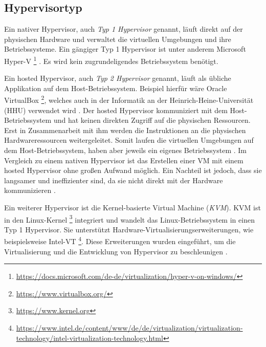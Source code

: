 \subsection{Hypervisortyp}
Ein nativer Hypervisor, auch \textit{Typ 1 Hypervisor} genannt, läuft direkt auf der physischen Hardware
und verwaltet die virtuellen Umgebungen und ihre Betriebssysteme. Ein gängiger Typ 1 Hypervisor ist
unter anderem Microsoft Hyper-V
\footnote{\url{https://docs.microsoft.com/de-de/virtualization/hyper-v-on-windows/}}
\cite{RedHatHypervisor}. Es wird kein zugrundeligendes Betriebssystem
benötigt.

Ein hosted Hypervisor, auch \textit{Typ 2 Hypervisor}  genannt, läuft als übliche
Applikation auf dem Host-Betriebssystem. Beispiel hierfür wäre Oracle VirtualBox
\footnote{\url{https://www.virtualbox.org/}}, welches auch in der Informatik
an der Heinrich-Heine-Universität (HHU) verwendet wird \cite{HHUFachschaft}.
Der hosted Hypervisor kommuniziert mit dem Host-Betriebssystem und hat keinen direkten Zugriff auf die
physischen Ressourcen. Erst in Zusammenarbeit mit ihm
werden die Instruktionen an die physischen Hardwareressourcen weitergeleitet.
Somit laufen die virtuellen Umgebungen auf dem Host-Betriebssystem,
haben aber jeweils ein eigenes Betriebssystem \cite{RedHatHypervisor}.
Im Vergleich zu einem nativen Hypervisor ist das Erstellen einer VM
mit einem hosted Hypervisor ohne großen Aufwand möglich.
Ein Nachteil ist jedoch, dass sie langsamer und ineffizienter sind, da sie nicht
direkt mit der Hardware kommunizieren \cite{IBMHypervisor}.

Ein weiterer Hypervisor ist die Kernel-basierte Virtual Machine (\textit{KVM}).
KVM ist in den Linux-Kernel \footnote{\url{https://www.kernel.org}} integriert und wandelt
das Linux-Betriebssystem in einen Typ 1 Hypervisor. Sie unterstützt
Hardware-Virtualisierungserweiterungen, wie beispielsweise Intel-VT
\footnote{\url{https://www.intel.de/content/www/de/de/virtualization/virtualization-technology/intel-virtualization-technology.html}}.
Diese Erweiterungen wurden eingeführt,
um die Virtualisierung und die Entwicklung
von Hypervisor zu beschleunigen \cite{IBMHypervisor} \cite{RedHatKVM}.

